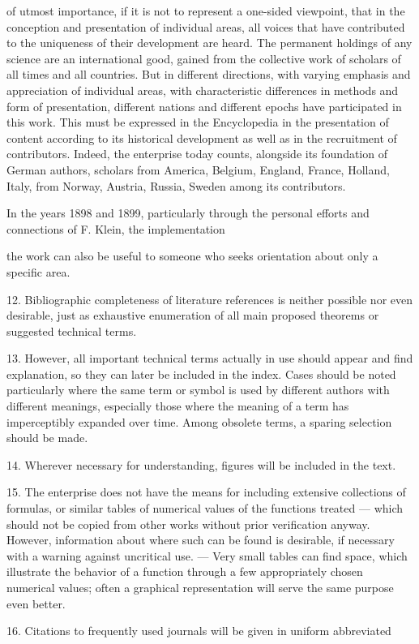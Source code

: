 \thispagestyle{fancy}

\vspace{0.5cm}

of utmost importance, if it is not to represent a one-sided viewpoint, that in the conception and presentation of individual areas, all voices that have contributed to the uniqueness of their development are heard. The permanent holdings of any science are an international good, gained from the collective work of scholars of all times and all countries. But in different directions, with varying emphasis and appreciation of individual areas, with characteristic differences in methods and form of presentation, different nations and different epochs have participated in this work. This must be expressed in the Encyclopedia in the presentation of content according to its historical development as well as in the recruitment of contributors. Indeed, the enterprise today counts, alongside its foundation of German authors, scholars from America, Belgium, England, France, Holland, Italy, from Norway, Austria, Russia, Sweden among its contributors.

In the years 1898 and 1899, particularly through the personal efforts and connections of F. Klein, the implementation

\vfill
\leftline{\rule{2in}{0.4pt}}
\vspace{0.2cm}
{\footnotesize the work can also be useful to someone who seeks orientation about only a specific area.

12. Bibliographic completeness of literature references is neither possible nor even desirable, just as exhaustive enumeration of all main proposed theorems or suggested technical terms.

13. However, all important technical terms actually in use should appear and find explanation, so they can later be included in the index. Cases should be noted particularly where the same term or symbol is used by different authors with different meanings, especially those where the meaning of a term has imperceptibly expanded over time. Among obsolete terms, a sparing selection should be made.

14. Wherever necessary for understanding, figures will be included in the text.

15. The enterprise does not have the means for including extensive collections of formulas, or similar tables of numerical values of the functions treated — which should not be copied from other works without prior verification anyway. However, information about where such can be found is desirable, if necessary with a warning against uncritical use. — Very small tables can find space, which illustrate the behavior of a function through a few appropriately chosen numerical values; often a graphical representation will serve the same purpose even better.

16. Citations to frequently used journals will be given in uniform abbreviated

}

